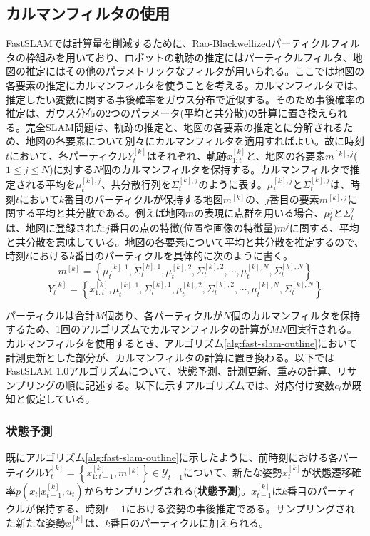 \documentclass[dvipdfmx,a4paper]{jsarticle}
\begin{document}
\subsection{カルマンフィルタの使用}
FastSLAMでは計算量を削減するために、Rao-Blackwellizedパーティクルフィルタの枠組みを用いており、ロボットの軌跡の推定にはパーティクルフィルタ、地図の推定にはその他のパラメトリックなフィルタが用いられる。ここでは地図の各要素の推定にカルマンフィルタを使うことを考える。カルマンフィルタでは、推定したい変数に関する事後確率をガウス分布で近似する。そのため事後確率の推定は、ガウス分布の2つのパラメータ(平均と共分散)の計算に置き換えられる。完全SLAM問題は、軌跡の推定と、地図の各要素の推定とに分解されるため、地図の各要素について別々にカルマンフィルタを適用すればよい。故に時刻$t$において、各パーティクル$Y_t^{[k]}$はそれぞれ、軌跡$x_{1 : t}^{[k]}$と、地図の各要素$m^{[k], j}$($1 \le j \le N$)に対する$N$個のカルマンフィルタを保持する。カルマンフィルタで推定される平均を$\mu_t^{[k], j}$、共分散行列を$\Sigma_t^{[k], j}$のように表す。$\mu_t^{[k], j}$と$\Sigma_t^{[k], j}$は、時刻$t$において$k$番目のパーティクルが保持する地図$m^{[k]}$の、$j$番目の要素$m^{[k], j}$に関する平均と共分散である。例えば地図$m$の表現に点群を用いる場合、$\mu_t^{j}$と$\Sigma_t^{j}$は、地図に登録された$j$番目の点の特徴(位置や画像の特徴量)$m^j$に関する、平均と共分散を意味している。地図の各要素について平均と共分散を推定するので、時刻$t$における$k$番目のパーティクルを具体的に次のように書く。
\begin{equation}
	m^{[k]} = \left\{ \mu_t^{[k], 1}, \Sigma_t^{[k], 1}, \mu_t^{[k], 2}, \Sigma_t^{[k], 2}, \cdots, \mu_t^{[k], N}, \Sigma_t^{[k], N} \right\}
\end{equation}
\begin{equation}
	Y_t^{[k]} = \left\{ x_{1 : t}^{[k]}, \mu_t^{[k], 1}, \Sigma_t^{[k], 1}, \mu_t^{[k], 2}, \Sigma_t^{[k], 2}, \cdots, \mu_t^{[k], N}, \Sigma_t^{[k], N} \right\}
\end{equation}

パーティクルは合計$M$個あり、各パーティクルが$N$個のカルマンフィルタを保持するため、1回のアルゴリズムでカルマンフィルタの計算が$MN$回実行される。カルマンフィルタを使用するとき、アルゴリズム\ref{alg:fast-slam-outline}において計測更新とした部分が、カルマンフィルタの計算に置き換わる。以下ではFastSLAM 1.0アルゴリズムについて、状態予測、計測更新、重みの計算、リサンプリングの順に記述する。以下に示すアルゴリズムでは、対応付け変数$c_t$が既知と仮定している。

\subsubsection{状態予測}
既にアルゴリズム\ref{alg:fast-slam-outline}に示したように、前時刻における各パーティクル$Y_t^{[k]} = \left\{ x_{1 : t - 1}^{[k]}, m^{[k]} \right\} \in \mathcal{Y}_{t - 1}$について、新たな姿勢$x_t^{[k]}$が状態遷移確率$p(x_t | x_{t - 1}^{[k]}, u_t)$からサンプリングされる(\textbf{状態予測})。$x_{t - 1}^{[k]}$は$k$番目のパーティクルが保持する、時刻$t - 1$における姿勢の事後推定である。サンプリングされた新たな姿勢$x_t^{[k]}$は、$k$番目のパーティクルに加えられる。
\end{document}
